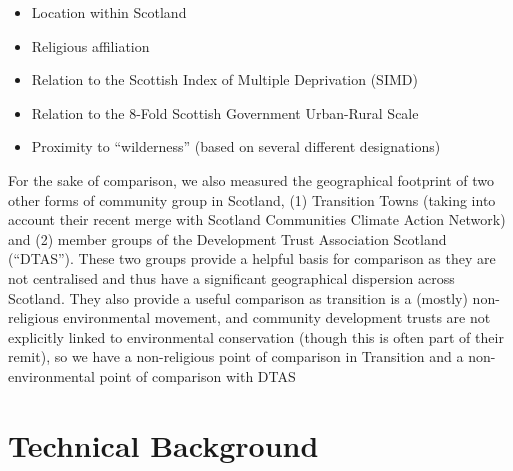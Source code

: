 \documentclass[11pt,]{article}
\providecommand{\tightlist}{%
  \setlength{\itemsep}{0pt}\setlength{\parskip}{0pt}}
\begin{document}
\begin{itemize}
\tightlist
\item
  Location within Scotland
\item
  Religious affiliation
\item
  Relation to the Scottish Index of Multiple Deprivation (SIMD)
\item
  Relation to the 8-Fold Scottish Government Urban-Rural Scale
\item
  Proximity to ``wilderness'' (based on several different designations)
\end{itemize}

For the sake of comparison, we also measured the geographical footprint
of two other forms of community group in Scotland, (1) Transition Towns
(taking into account their recent merge with Scotland Communities
Climate Action Network) and (2) member groups of the Development Trust
Association Scotland (``DTAS''). These two groups provide a helpful
basis for comparison as they are not centralised and thus have a
significant geographical dispersion across Scotland. They also provide a
useful comparison as transition is a (mostly) non-religious
environmental movement, and community development trusts are not
explicitly linked to environmental conservation (though this is often
part of their remit), so we have a non-religious point of comparison in
Transition and a non-environmental point of comparison with DTAS

\hypertarget{technical-background}{%
\section{Technical Background}\label{technical-background}}
\end{document}
